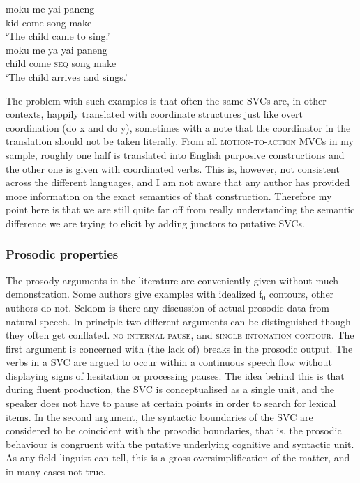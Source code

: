 \ea \label{abui20} 
\ea
\gll moku me yai paneng \\
kid come song make \\
\glft `The child came to sing.’ \\ 
\ex
\gll moku me ya yai paneng \\ 
child come \textsc{seq} song make \\
\glft `The child arrives and sings.’\\ 
\z
\z

The problem with such examples is that often the same SVCs are, in other contexts, happily translated with coordinate structures just like overt coordination (do x and do y), sometimes with a note that the coordinator in the translation should not be taken literally. From all \textsc{motion-to-action} MVCs in my sample, roughly one half is translated into English purposive constructions and the other one is given with coordinated verbs. This is, however, not consistent across the different languages, and I am not aware that any author has provided more information on the exact semantics of that construction. Therefore my point here is that we are still quite far off from really understanding the semantic difference we are trying to elicit by adding junctors to putative SVCs. 

\subsubsection{Prosodic properties} \label{sec:prosodic}

The prosody arguments in the literature are conveniently given without much demonstration. Some authors give examples with idealized f$_0$ contours, other authors do not. Seldom is there any discussion of actual prosodic data from natural speech. In principle two different arguments can be distinguished though they often get conflated. 
\textsc{no internal pause}, and \textsc{single intonation contour}. The first argument is concerned with (the lack of) breaks in the prosodic output. The verbs in a SVC are argued to occur within a continuous speech flow without displaying signs of hesitation or processing pauses. The idea behind this is that during fluent production, the SVC is conceptualised as a single unit, and the speaker does not have to pause at certain points in order to search for lexical items. In the second argument, the syntactic boundaries of the SVC are considered to be coincident with the prosodic boundaries, that is, the prosodic behaviour is congruent with the putative underlying cognitive and syntactic unit. As any field linguist can tell, this is a gross oversimplification of the matter, and in many cases not true.

